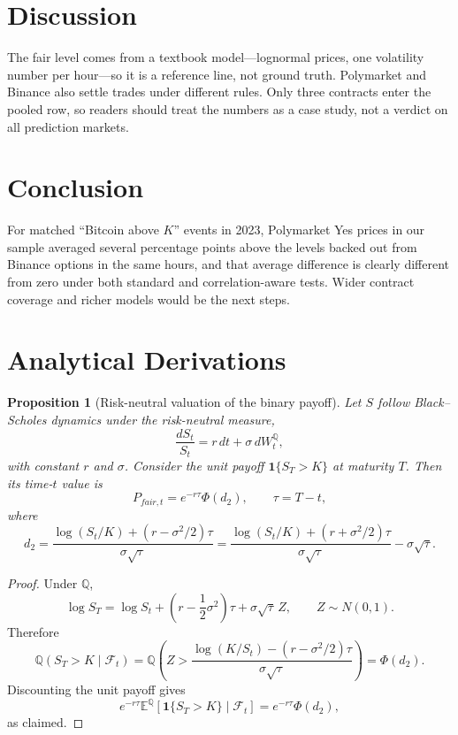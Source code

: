 \documentclass[11pt]{article}
\numberwithin{equation}{section}
\theoremstyle{plain}
\newtheorem{proposition}{Proposition}[section]
\begin{document}
\section{Discussion}
The fair level comes from a textbook model---lognormal prices, one volatility number per hour---so it is a reference line, not ground truth. Polymarket and Binance also settle trades under different rules. Only three contracts enter the pooled row, so readers should treat the numbers as a case study, not a verdict on all prediction markets.

\section{Conclusion}
For matched ``Bitcoin above $K$'' events in 2023, Polymarket Yes prices in our sample averaged several percentage points above the levels backed out from Binance options in the same hours, and that average difference is clearly different from zero under both standard and correlation-aware tests. Wider contract coverage and richer models would be the next steps.

\appendix

\section{Analytical Derivations}

\begin{proposition}[Risk-neutral valuation of the binary payoff]
\label{prop:digital-price}
Let $S$ follow Black--Scholes dynamics under the risk-neutral measure,
\[
\frac{dS_t}{S_t}=r\,dt+\sigma\,dW_t^{\mathbb{Q}},
\]
with constant $r$ and $\sigma$. Consider the unit payoff $\mathbf{1}\{S_T>K\}$ at maturity $T$. Then its time-$t$ value is
\[
P_{fair,t}=e^{-r\tau}\Phi(d_2),
\qquad
\tau=T-t,
\]
where
\[
d_2=\frac{\log(S_t/K)+(r-\sigma^2/2)\tau}{\sigma\sqrt{\tau}}
=
\frac{\log(S_t/K)+(r+\sigma^2/2)\tau}{\sigma\sqrt{\tau}}-\sigma\sqrt{\tau}.
\]
\end{proposition}

\begin{proof}
Under $\mathbb{Q}$,
\[
\log S_T
=
\log S_t+\left(r-\frac{1}{2}\sigma^2\right)\tau+\sigma\sqrt{\tau}\,Z,
\qquad
Z\sim N(0,1).
\]
Therefore
\[
\mathbb{Q}(S_T>K\mid\mathcal{F}_t)
=
\mathbb{Q}\!\left(
Z>
\frac{\log(K/S_t)-\left(r-\sigma^2/2\right)\tau}{\sigma\sqrt{\tau}}
\right)
=
\Phi(d_2).
\]
Discounting the unit payoff gives
\[
e^{-r\tau}\mathbb{E}^{\mathbb{Q}}\!\left[\mathbf{1}\{S_T>K\}\mid\mathcal{F}_t\right]
=
e^{-r\tau}\Phi(d_2),
\]
as claimed.
\end{proof}
\end{document}
